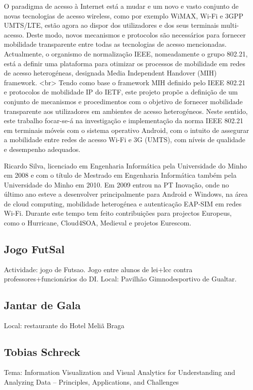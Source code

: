 O paradigma de acesso à Internet está a mudar e um novo e vasto conjunto de novas tecnologias de acesso wireless, como por exemplo WiMAX, Wi-Fi e 3GPP UMTS/LTE, estão agora ao dispor dos utilizadores e dos seus terminais multi-acesso. Deste modo, novos mecanismos e protocolos são necessários para fornecer mobilidade transparente entre todas as tecnologias de acesso mencionadas. Actualmente, o organismo de normalização IEEE, nomeadamente o grupo 802.21, está a definir uma plataforma para otimizar os processos de mobilidade em redes de acesso heterogéneas, designada Media Independent Handover (MIH) framework.  <br> Tendo como base o framework MIH definido pelo IEEE 802.21 e protocolos de mobilidade IP do IETF, este projeto propõe a definição de um conjunto de mecanismos e procedimentos com o objetivo de fornecer mobilidade transparente aos utilizadores em ambientes de acesso heterogéneos. Neste sentido, este trabalho focar-se-á na investigação e implementação da norma IEEE 802.21 em terminais móveis com o sistema operativo Android, com o intuito de assegurar a mobilidade entre redes de acesso Wi-Fi e 3G (UMTS), com níveis de qualidade e desempenho adequados.

Ricardo Silva, licenciado em Engenharia Informática pela Universidade do Minho em 2008 e com o título de Mestrado em Engenharia Informática também pela Universidade do Minho em 2010. Em 2009 entrou na PT Inovação, onde no último ano esteve a desenvolver principalmente para Android e Windows, na área de cloud computing, mobilidade heterogénea e autenticação EAP-SIM em redes Wi-Fi. Durante este tempo tem feito contribuições para projectos Europeus, como o Hurricane, Cloud4SOA, Medieval e projetos Eurescom.

\subsection{Jogo FutSal}
Actividade: jogo de Futsao.
Jogo entre alunos de lei+lcc contra professores+funcionários do DI.
Local: Pavilhão Gimnodesportivo de Gualtar.

\subsection{Jantar de Gala}
Local: restaurante do Hotel Meliã Braga

\subsection{Tobias Schreck}
Tema: Information Visualization and Visual Analytics for Understanding and Analyzing Data – Principles, Applications, and Challenges

